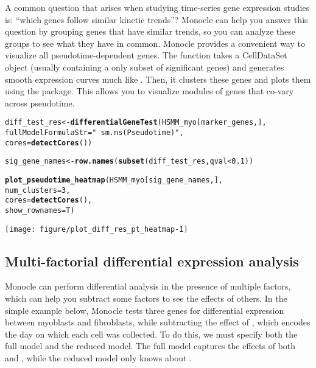 \documentclass[10pt,oneside]{article}\usepackage[]{graphicx}\usepackage[]{color}
\makeatletter
\def\maxwidth{ %
  \ifdim\Gin@nat@width>\linewidth
    \linewidth
  \else
    \Gin@nat@width
  \fi
}
\newcommand{\hlnum}[1]{\textcolor[rgb]{0.686,0.059,0.569}{#1}}%
\newcommand{\hlstr}[1]{\textcolor[rgb]{0.192,0.494,0.8}{#1}}%
\newcommand{\hlopt}[1]{\textcolor[rgb]{0,0,0}{#1}}%
\newcommand{\hlstd}[1]{\textcolor[rgb]{0.345,0.345,0.345}{#1}}%
\newcommand{\hlkwb}[1]{\textcolor[rgb]{0.69,0.353,0.396}{#1}}%
\newcommand{\hlkwc}[1]{\textcolor[rgb]{0.333,0.667,0.333}{#1}}%
\newcommand{\hlkwd}[1]{\textcolor[rgb]{0.737,0.353,0.396}{\textbf{#1}}}%
\newenvironment{kframe}{%
 \def\at@end@of@kframe{}%
 \ifinner\ifhmode%
  \def\at@end@of@kframe{\end{minipage}}%
  \begin{minipage}{\columnwidth}%
 \fi\fi%
 \def\FrameCommand##1{\hskip\@totalleftmargin \hskip-\fboxsep
 \colorbox{shadecolor}{##1}\hskip-\fboxsep
     \hskip-\linewidth \hskip-\@totalleftmargin \hskip\columnwidth}%
 \MakeFramed {\advance\hsize-\width
   \@totalleftmargin\z@ \linewidth\hsize
   \@setminipage}}%
 {\par\unskip\endMakeFramed%
 \at@end@of@kframe}
\newenvironment{knitrout}{}{} %
\makeatother
\begin{document}
A common question that arises when studying time-series gene expression studies is: ``which genes follow similar kinetic trends''?  Monocle can help you answer this question by grouping genes that have similar trends, so you can analyze these groups to see what they have in common.  Monocle provides a convenient way to visualize all pseudotime-dependent genes. The function
 takes a CellDataSet object (usually containing a only subset of significant genes)
and generates smooth expression curves much like  . Then, it clusters these genes 
and plots them using the  package.  This allows you to visualize modules of genes that
co-vary across pseudotime.

\begin{knitrout}
\color{fgcolor}\begin{kframe}
\begin{alltt}
\hlstd{diff_test_res} \hlkwb{<-} \hlkwd{differentialGeneTest}\hlstd{(HSMM_myo[marker_genes,],}
                                      \hlkwc{fullModelFormulaStr}\hlstd{=}\hlstr{"~sm.ns(Pseudotime)"}\hlstd{,}
                                      \hlkwc{cores} \hlstd{=} \hlkwd{detectCores}\hlstd{())}

\hlstd{sig_gene_names} \hlkwb{<-} \hlkwd{row.names}\hlstd{(}\hlkwd{subset}\hlstd{(diff_test_res, qval} \hlopt{<} \hlnum{0.1}\hlstd{))}


\hlkwd{plot_pseudotime_heatmap}\hlstd{(HSMM_myo[sig_gene_names,],}
                        \hlkwc{num_clusters} \hlstd{=} \hlnum{3}\hlstd{,}
                        \hlkwc{cores} \hlstd{=} \hlkwd{detectCores}\hlstd{(),}
                        \hlkwc{show_rownames} \hlstd{= T)}
\end{alltt}
\end{kframe}

{\centering \texttt{[image: figure/plot\_diff\_res\_pt\_heatmap-1]} 

}



\end{knitrout}



\subsection{Multi-factorial differential expression analysis}

Monocle can perform differential analysis in the presence of multiple factors, which can help you subtract some factors to see the effects of others.  In the simple example below, Monocle tests three genes for differential expression between myoblasts and fibroblasts, while subtracting the effect of , which encodes the day on which each cell was collected. To do this, we must specify both the full model and the reduced model. The full model captures the effects of both  and , while the reduced model only knows about .  
\end{document}
